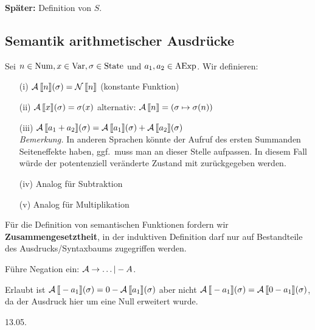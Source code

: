 \textbf{Später:} Definition von $S$.



\subsection{Semantik arithmetischer Ausdrücke}

\begin{definition}\label{def:Asem}
    Sei $n \in \Num, x \in \Var, \sigma \in \State$ und $a_1, a_2 \in \AExp$. Wir definieren:
    \begin{enumerate}
        \item[(i)] $\A\lsem n \rsem(\sigma) = \N\lsem n \rsem$ \quad\quad (konstante Funktion)
        \item[(ii)] $\A\lsem x \rsem(\sigma) = \sigma(x)$ \quad\quad\quad alternativ: $\A\lsem n \rsem = (\sigma \mapsto \sigma(n))$
        \item[(iii)] $\A\lsem a_1 + a_2 \rsem(\sigma) = \A\lsem a_1 \rsem(\sigma) + \A\lsem a_2 \rsem(\sigma)$ \\[4pt]
        \emph{Bemerkung.} In anderen Sprachen könnte der Aufruf des ersten Summanden Seiteneffekte haben, \dh{} ggf.\ muss man an dieser Stelle aufpassen. In diesem Fall würde der potentenziell veränderte Zustand mit zurückgegeben werden.
        \item[(iv)] Analog für Subtraktion
        \item[(v)] Analog für Multiplikation
    \end{enumerate}
\end{definition}

\begin{remark}
    Für die Definition von semantischen Funktionen fordern wir \textbf{Zusammengesetztheit}, \dh{} in der induktiven Definition darf nur auf Bestandteile des Ausdrucks/Syntaxbaums zugegriffen werden.
\end{remark}

\begin{example}
    Führe Negation ein: $\A \to \dots | -A$.

    Erlaubt ist $\A\lsem -a_1 \rsem(\sigma) = 0 - \A\lsem a_1 \rsem(\sigma)$ aber nicht $\A\lsem -a_1 \rsem(\sigma) = \A\lsem 0 - a_1 \rsem(\sigma)$, da der Ausdruck hier um eine Null erweitert wurde.
\end{example}



\newpage
\hfill 13.05.

